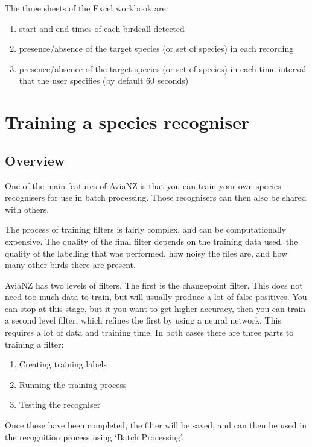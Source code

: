 \documentclass{article}
\begin{document}
The three sheets of the Excel workbook are:
\begin{enumerate}
\item start and end times of each birdcall detected
\item presence/absence of the target species (or set of species) in each recording
\item  presence/absence of the target species (or set of species) in each time interval that the user specifies (by default 60 seconds)
\end{enumerate}

\newpage
\section{Training a species recogniser}\label{sec:trainfilter}

\subsection{Overview}

One of the main features of AviaNZ is that you can train your own species recognisers for use in batch processing. Those recognisers can then also be shared with others. 

The process of training filters is fairly complex, and can be computationally expensive. The quality of the final filter depends on the training data used, the quality of the labelling that was performed, how noisy the files are, and how many other birds there are present.

AviaNZ has two levels of filters. The first is the changepoint  filter. This does not need too much data to train, but will usually produce a lot of false positives. You can stop at this stage, but it you want to get higher accuracy, then you can train a second level filter, which refines the first by using a neural network. This requires a lot of data and training time. In both cases there are three parts to training a filter:

\begin{enumerate}
\item Creating training labels
\item Running the training process
\item Testing the recogniser
\end{enumerate}

Once these have been completed, the filter will be saved, and can then be used in the recognition process using `Batch Processing'. 
\end{document}
